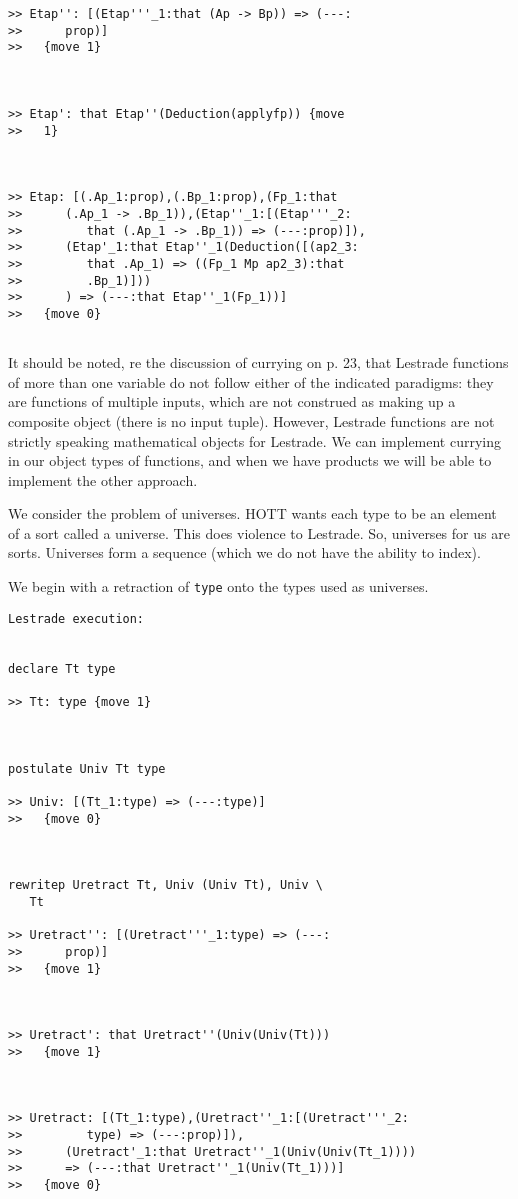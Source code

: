 \documentclass{article}
\begin{document}
\begin{verbatim}
>> Etap'': [(Etap'''_1:that (Ap -> Bp)) => (---:
>>      prop)]
>>   {move 1}



>> Etap': that Etap''(Deduction(applyfp)) {move
>>   1}



>> Etap: [(.Ap_1:prop),(.Bp_1:prop),(Fp_1:that
>>      (.Ap_1 -> .Bp_1)),(Etap''_1:[(Etap'''_2:
>>         that (.Ap_1 -> .Bp_1)) => (---:prop)]),
>>      (Etap'_1:that Etap''_1(Deduction([(ap2_3:
>>         that .Ap_1) => ((Fp_1 Mp ap2_3):that
>>         .Bp_1)]))
>>      ) => (---:that Etap''_1(Fp_1))]
>>   {move 0}


\end{verbatim}

It should be noted, re the discussion of currying on p. 23, that Lestrade functions of more than one variable do not follow either of the indicated paradigms:  they are functions of multiple inputs, which are not construed as making up a composite object (there is no input tuple).  However, Lestrade functions are not strictly speaking mathematical objects for Lestrade.
We can implement currying in our object types of functions, and when we have products we will be able to implement the other approach.

We consider the problem of universes.  HOTT wants each type to be an element of a sort called a universe.  This does violence to Lestrade.
So, universes for us are sorts.  Universes form a sequence (which we do not have the ability to index).


We begin with a retraction of {\tt type} onto the types used as universes.

\begin{verbatim}Lestrade execution:


declare Tt type

>> Tt: type {move 1}



postulate Univ Tt type

>> Univ: [(Tt_1:type) => (---:type)]
>>   {move 0}



rewritep Uretract Tt, Univ (Univ Tt), Univ \
   Tt

>> Uretract'': [(Uretract'''_1:type) => (---:
>>      prop)]
>>   {move 1}



>> Uretract': that Uretract''(Univ(Univ(Tt)))
>>   {move 1}



>> Uretract: [(Tt_1:type),(Uretract''_1:[(Uretract'''_2:
>>         type) => (---:prop)]),
>>      (Uretract'_1:that Uretract''_1(Univ(Univ(Tt_1))))
>>      => (---:that Uretract''_1(Univ(Tt_1)))]
>>   {move 0}


\end{verbatim}
\end{document}
